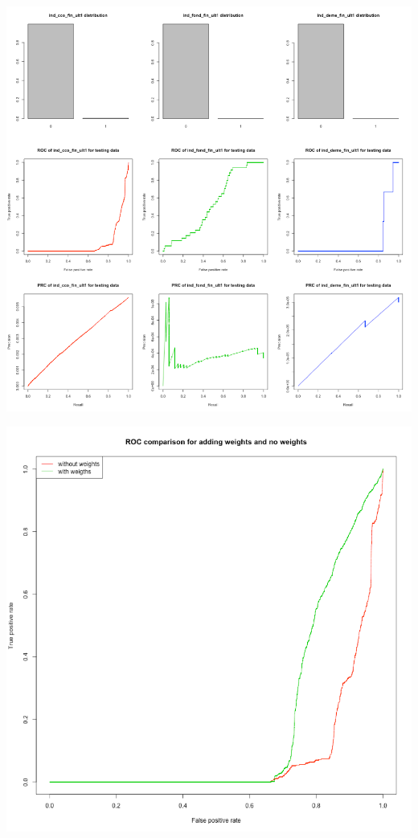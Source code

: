 \documentclass{article}
\begin{document}
\begin{spacing}{1}
\begin{large}
\begin{multicols}{2}
\vspace{5mm}
\includegraphics[scale = 0.3]{ROCandPR.png}
\vspace{5mm}

\includegraphics[scale = 0.3]{ROCwithandwithoutweights.png}



\end{multicols}
\end{large}
\end{spacing}
\end{document}
